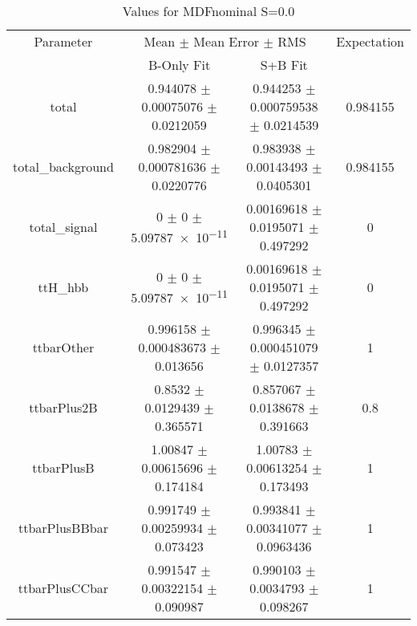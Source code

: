 \begin{table}
\centering
\caption{Values for MDFnominal S=0.0}
\begin{tabular}{cccc}
\toprule
Parameter & \multicolumn{2}{c}{Mean $\pm$ Mean Error $\pm$ RMS} & Expectation\\
 & B-Only Fit & S+B Fit & \\
\midrule
total & \num{0.944078} $\pm$ \num{0.00075076} $\pm$ \num{0.0212059} & \num{0.944253} $\pm$ \num{0.000759538} $\pm$ \num{0.0214539} & \num{0.984155}\\
total\_background & \num{0.982904} $\pm$ \num{0.000781636} $\pm$ \num{0.0220776} & \num{0.983938} $\pm$ \num{0.00143493} $\pm$ \num{0.0405301} & \num{0.984155}\\
total\_signal & \num{0} $\pm$ \num{0} $\pm$ \num{5.09787e-11} & \num{0.00169618} $\pm$ \num{0.0195071} $\pm$ \num{0.497292} & \num{0}\\
ttH\_hbb & \num{0} $\pm$ \num{0} $\pm$ \num{5.09787e-11} & \num{0.00169618} $\pm$ \num{0.0195071} $\pm$ \num{0.497292} & \num{0}\\
ttbarOther & \num{0.996158} $\pm$ \num{0.000483673} $\pm$ \num{0.013656} & \num{0.996345} $\pm$ \num{0.000451079} $\pm$ \num{0.0127357} & \num{1}\\
ttbarPlus2B & \num{0.8532} $\pm$ \num{0.0129439} $\pm$ \num{0.365571} & \num{0.857067} $\pm$ \num{0.0138678} $\pm$ \num{0.391663} & \num{0.8}\\
ttbarPlusB & \num{1.00847} $\pm$ \num{0.00615696} $\pm$ \num{0.174184} & \num{1.00783} $\pm$ \num{0.00613254} $\pm$ \num{0.173493} & \num{1}\\
ttbarPlusBBbar & \num{0.991749} $\pm$ \num{0.00259934} $\pm$ \num{0.073423} & \num{0.993841} $\pm$ \num{0.00341077} $\pm$ \num{0.0963436} & \num{1}\\
ttbarPlusCCbar & \num{0.991547} $\pm$ \num{0.00322154} $\pm$ \num{0.090987} & \num{0.990103} $\pm$ \num{0.0034793} $\pm$ \num{0.098267} & \num{1}\\
\bottomrule
\end{tabular}
\end{table}